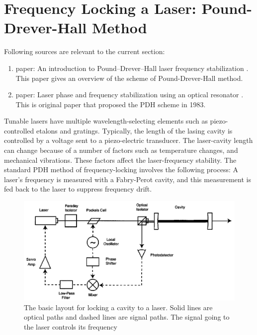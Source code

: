 \documentclass[11pt,A4Paper]{article}
\begin{document}
\section{Frequency Locking a Laser: Pound-Drever-Hall Method}
Following sources are relevant to the current section: 
\begin{enumerate}
    \item paper: An introduction to Pound–Drever–Hall laser frequency stabilization \cite{PDHintro}. This paper gives an overview of the scheme of Pound-Drever-Hall method. 
    \item paper: Laser phase and frequency stabilization using an optical resonator \cite{PDH1983}. This is original paper that proposed the PDH scheme in 1983. 
\end{enumerate}

Tunable lasers have multiple wavelength-selecting elements such as piezo-controlled etalons and gratings. Typically, the length of the lasing cavity is controlled by a voltage sent to a piezo-electric transducer. The laser-cavity length can change because of a number of factors such as temperature changes, and mechanical vibrations. These factors affect the laser-frequency stability. The standard PDH method of frequency-locking involves the following process: A laser's frequency is measured with a Fabry-Perot cavity, and this measurement is fed back to the laser to suppress frequency drift. \cite{PDH1983}\cite{PDHintro}
\par
\begin{figure}[H]
    \centering
    \includegraphics[width=.8\textwidth]{PDHlayout.png}
    \caption{The basic layout for locking a cavity to a laser. Solid lines are optical paths and dashed lines are signal paths. The signal going to the laser controls its frequency \cite{PDHintro}}
    \label{fig:PDHlayout}
\end{figure}
\end{document}
